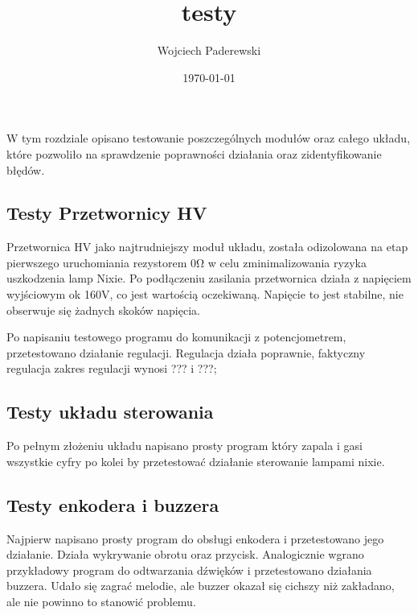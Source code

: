\documentclass[../main.tex]{subfiles}
\author{Wojciech Paderewski}
\date{\today}
\title{testy}
\begin{document}
W tym rozdziale opisano testowanie poszczególnych 
modułów oraz całego układu, które pozwoliło na sprawdzenie poprawności działania oraz zidentyfikowanie błędów.

\subsection{Testy Przetwornicy HV}
Przetwornica HV jako najtrudniejszy moduł układu, została odizolowana na etap pierwszego uruchomiania rezystorem 0\si{\ohm}
w celu zminimalizowania ryzyka uszkodzenia lamp Nixie. Po podłączeniu zasilania przetwornica działa z napięciem wyjściowym 
ok 160V, co jest wartością oczekiwaną. Napięcie to jest stabilne, nie obserwuje się żadnych skoków napięcia.


Po napisaniu testowego programu do komunikacji z potencjometrem, przetestowano działanie regulacji. Regulacja działa poprawnie, faktyczny regulacja 
zakres regulacji wynosi ??? i ???;



\subsection{Testy układu sterowania}
Po pełnym złożeniu układu napisano prosty program który zapala i gasi wszystkie cyfry po kolei by przetestować działanie sterowanie
lampami nixie.


\subsection{Testy enkodera i buzzera}
Najpierw napisano prosty program do obsługi enkodera i przetestowano jego działanie. Działa wykrywanie obrotu oraz przycisk. Analogicznie
wgrano przykładowy program do odtwarzania dźwięków i przetestowano działania buzzera. Udało się zagrać melodie, ale buzzer okazał się cichszy
niż zakładano, ale nie powinno to stanowić problemu.
\end{document}
